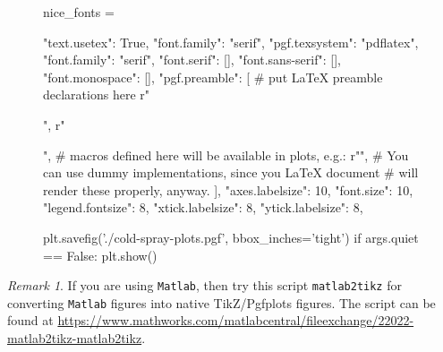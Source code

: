 \documentclass[authoryear,3p,times,preprint,review,fleqn]{elsarticle}
\numberwithin{equation}{section}
\theoremstyle{remark}
\newtheorem{rmk}{Remark}
\begin{document}
\begin{appendix}
\begin{figure}[!h]
  \begin{snippet}[caption={Python script for plotting data.},label={snippet_matplotlib_pgf},framerule=1pt,tabsize=3]   
    nice_fonts = {
            "text.usetex": True,
            "font.family": "serif",
            "pgf.texsystem": "pdflatex",
            "font.family": "serif",
            "font.serif": [],
            "font.sans-serif": [],
            "font.monospace": [],
            "pgf.preamble": [
            # put LaTeX preamble declarations here
            r"\usepackage[utf8x]{inputenc}",
            r"\usepackage[T1]{fontenc}",
            # macros defined here will be available in plots, e.g.:
            r"\newcommand{\vect}[1]{#1}",
            # You can use dummy implementations, since you LaTeX document
            # will render these properly, anyway.
            ],
            "axes.labelsize": 10,
            "font.size": 10,
            "legend.fontsize": 8,
            "xtick.labelsize": 8,
            "ytick.labelsize": 8,
    }
    plt.savefig('./cold-spray-plots.pgf', bbox_inches='tight') 
    if args.quiet == False:
        plt.show()
  \end{snippet}
\end{figure}

\begin{rmk}
If you are using \texttt{Matlab}, then try this script \texttt{matlab2tikz} for converting \texttt{Matlab} figures into native TikZ/Pgfplots figures. The script can be found at
\url{https://www.mathworks.com/matlabcentral/fileexchange/22022-matlab2tikz-matlab2tikz}.
\end{rmk}



\end{appendix}




%
%


\end{document}
